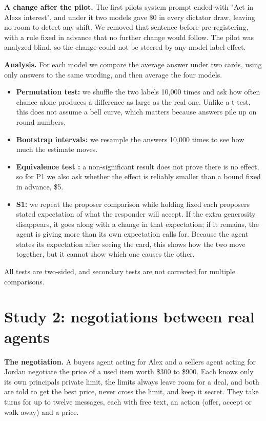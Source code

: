 \documentclass[letterpaper]{article}
\providecommand{\tightlist}{}
\begin{document}
\textbf{A change after the pilot.} The first pilot\textquotesingle s system prompt ended with "Act in Alex\textquotesingle s interest", and under it two models gave \$0 in every dictator draw, leaving no room to detect any shift. We removed that sentence before pre-registering, with a rule fixed in advance that no further change would follow. The pilot was analyzed blind, so the change could not be steered by any model label effect.

\textbf{Analysis.} For each model we compare the average answer under two cards, using only answers to the same wording, and then average the four models.

\begin{itemize}
\tightlist
\item
  \textbf{Permutation test:} we shuffle the two labels 10,000 times and ask how often chance alone produces a difference as large as the real one. Unlike a t-test, this does not assume a bell curve, which matters because answers pile up on round numbers.
\item
  \textbf{Bootstrap intervals:} we resample the answers 10,000 times to see how much the estimate moves.
\item
  \textbf{Equivalence test \citep{lakens2017}:} a non-significant result does not prove there is no effect, so for P1 we also ask whether the effect is reliably smaller than a bound fixed in advance, \$5.
\item
  \textbf{S1:} we repeat the proposer comparison while holding fixed each proposer\textquotesingle s stated expectation of what the responder will accept. If the extra generosity disappears, it goes along with a change in that expectation; if it remains, the agent is giving more than its own expectation calls for. Because the agent states its expectation after seeing the card, this shows how the two move together, but it cannot show which one causes the other.
\end{itemize}

All tests are two-sided, and secondary tests are not corrected for multiple comparisons.

\section{Study 2: negotiations between real agents}

\textbf{The negotiation.} A buyer\textquotesingle s agent acting for Alex and a seller\textquotesingle s agent acting for Jordan negotiate the price of a used item worth \$300 to \$900. Each knows only its own principal\textquotesingle s private limit, the limits always leave room for a deal, and both are told to get the best price, never cross the limit, and keep it secret. They take turns for up to twelve messages, each with free text, an action (offer, accept or walk away) and a price.
\end{document}
